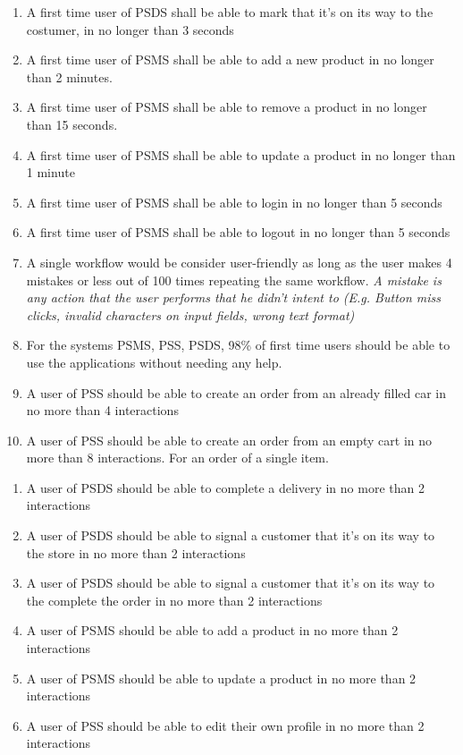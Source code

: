 \begin{enumerate}[resume, label=USE-\arabic*]
    \item A first time user of PSDS shall be able to mark that it’s on its 
    way to the costumer, in no longer than 3 seconds
    \item A first time user of PSMS shall be able to add a new product in 
    no longer than 2 minutes.
    \item A first time user of PSMS shall be able to remove a product in 
    no longer than 15 seconds.
    \item A first time user of PSMS shall be able to update a product in 
    no longer than 1 minute
    \item A first time user of PSMS shall be able to login in no longer 
    than 5 seconds
    \item A first time user of PSMS shall be able to logout in no longer 
    than 5 seconds
    \item A single workflow would be consider user-friendly as long as the 
    user makes 4 mistakes or less out of 100 times repeating the same workflow. 
    \textit{A mistake is any action that the user performs that he didn’t 
    intent to (E.g. Button miss clicks, invalid characters on input fields, 
    wrong text format)}
    \item For the systems PSMS, PSS, PSDS, 98\% of first time users should be 
    able to use the applications without needing any help.
    \item A user of PSS should be able to create an order from an already 
    filled car in no more than 4 interactions
    \item A user of PSS should be able to create an order from an empty cart 
    in no more than 8 interactions. For an order of a single item.
\end{enumerate}
\pagebreak
\begin{enumerate}[resume, label=USE-\arabic*]
    \item A user of PSDS should be able to complete a delivery in no more 
    than 2 interactions
    \item A user of PSDS should be able to signal a customer that it’s on its 
    way to the store in no more than 2 interactions
    \item A user of PSDS should be able to signal a customer that it’s on its
    way to the complete the order in no more than 2 interactions
    \item A user of PSMS should be able to add a product in no more 
    than 2 interactions
    \item A user of PSMS should be able to update a product in no more 
    than 2 interactions
    \item A user of PSS should be able to edit their own profile in no more 
    than 2 interactions
    
\end{enumerate}

